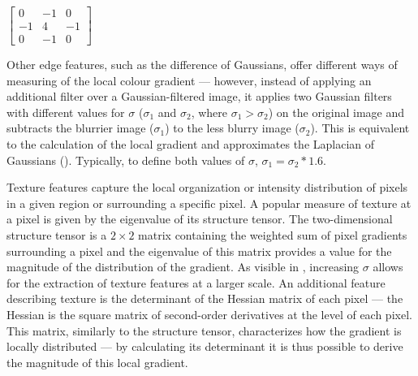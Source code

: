 \begin{center}
    $\begin{bmatrix}0 & -1 & 0\\-1 & 4 & -1\\0 & -1 & 0\end{bmatrix}$
\end{center}

\begin{figure}[!ht]
	\label{fig:segmentation-example-edges}
\end{figure}

Other edge features, such as the difference of Gaussians, offer different ways of measuring of the local colour gradient --- however, instead of applying an additional filter over a Gaussian-filtered image, it applies two Gaussian filters with different values for $\sigma$ ($\sigma_1$ and $\sigma_2$, where $\sigma_1 > \sigma_2$) on the original image and subtracts the blurrier image ($\sigma_1$) to the less blurry image ($\sigma_2$). This is equivalent to the calculation of the local gradient and approximates the Laplacian of Gaussians \cite{Bundy1984-uu} (). Typically, to define both values of $\sigma$, $\sigma_1 = \sigma_2 * 1.6$.

Texture features capture the local organization or intensity distribution of pixels in a given region or surrounding a specific pixel. A popular measure of texture at a pixel is given by the eigenvalue of its structure tensor. The two-dimensional structure tensor is a $2 \times 2$ matrix containing the weighted sum of pixel gradients surrounding a pixel and the eigenvalue of this matrix provides a value for the magnitude of the distribution of the gradient. As visible in , increasing $\sigma$ allows for the extraction of texture features at a larger scale. An additional feature describing texture is the determinant of the Hessian matrix of each pixel --- the Hessian is the square matrix of second-order derivatives at the level of each pixel. This matrix, similarly to the structure tensor, characterizes how the gradient is locally distributed --- by calculating its determinant it is thus possible to derive the magnitude of this local gradient.

\begin{figure}[!ht]
	\label{fig:segmentation-example-texture}
\end{figure}

